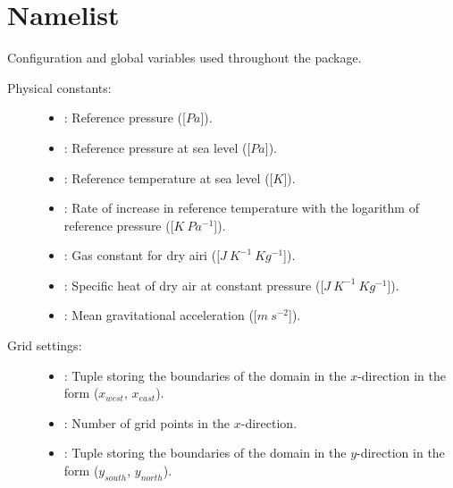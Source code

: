\documentclass[letterpaper,10pt,english]{sphinxmanual}
\begin{document}
\section{Namelist}
\label{\detokenize{api:namelist}}\label{\detokenize{api:module-namelist}}
Configuration and global variables used throughout the package.
\begin{description}
\item[{Physical constants:}] \leavevmode\begin{itemize}
\item {} 
: Reference pressure ({[}\(Pa\){]}).

\item {} 
: Reference pressure at sea level ({[}\(Pa\){]}).

\item {} 
: Reference temperature at sea level ({[}\(K\){]}).

\item {} 
: Rate of increase in reference temperature with the logarithm           of reference pressure ({[}\(K ~ Pa^{-1}\){]}).

\item {} 
: Gas constant for dry airi ({[}\(J ~ K^{-1} ~ Kg^{-1}\){]}).

\item {} 
: Specific heat of dry air at constant pressure ({[}\(J ~ K^{-1} ~ Kg^{-1}\){]}).

\item {} 
: Mean gravitational acceleration ({[}\(m ~ s^{-2}\){]}).

\end{itemize}

\item[{Grid settings:}] \leavevmode\begin{itemize}
\item {} 
: Tuple storing the boundaries of the domain in the \(x\)-direction              in the form (\(x_{west}\), \(x_{east}\)).

\item {} 
: Number of grid points in the \(x\)-direction.

\item {} 
: Tuple storing the boundaries of the domain in the \(y\)-direction              in the form (\(y_{south}\), \(y_{north}\)).

\end{itemize}

\end{description}
\end{document}
